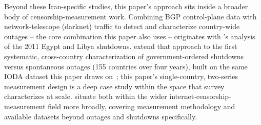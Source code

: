Beyond these Iran-specific studies, this paper's approach sits inside a
broader body of censorship-measurement work. Combining BGP control-plane
data with network-telescope (darknet) traffic to detect and characterize
country-wide outages -- the core combination this paper also uses --
originates with \citet{dainotti2013outages}'s analysis of the 2011 Egypt
and Libya shutdowns. \citet{bischof2023destination} extend that approach
to the first systematic, cross-country characterization of
government-ordered shutdowns versus spontaneous outages (155 countries
over four years), built on the same IODA dataset this paper draws
on~\citep{alcock2024ioda}; this paper's single-country, two-series
measurement design is a deep case study within the space that survey
characterizes at scale. \citet{wendzel2025survey} situate both within the
wider internet-censorship-measurement field more broadly, covering
measurement methodology and available datasets beyond outages and
shutdowns specifically.
